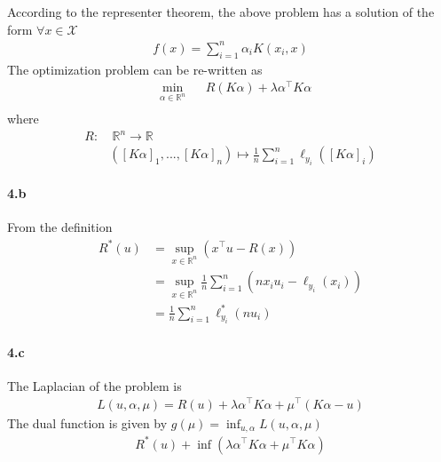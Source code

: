 \documentclass[10pt]{article}
\begin{document}
    According to the representer theorem, the above problem has a solution of
    the form $\forall x\in \mathcal{X}$
    \begin{align*}
        f(x) = \sum_{i=1}^n \alpha_i K(x_i, x)
    \end{align*}
    The optimization problem can be re-written as 
    \begin{equation*}
        \begin{aligned}
        & \underset{\alpha\in\mathbb{R}^n}{\text{min}}
        & & R(K\alpha) + \lambda \alpha^\top K \alpha\\
        \end{aligned}
    \end{equation*} 
    where 
    \begin{align*}
        R:& \ \mathbb{R}^n \rightarrow \mathbb{R}\\
        & ([K\alpha]_1, ..., [K\alpha]_n) \mapsto \frac{1}{n}\sum_{i=1}^n
        \ell_{y_i}([K\alpha]_i)
    \end{align*}

    \paragraph{4.b} From the definition
    \begin{align*}
        R^*(u) &= \sup_{x \in \mathbb{R}^n}\left( x^\top u - R(x) \right) \\
        &= \sup_{x \in \mathbb{R}^n} \frac{1}{n}\sum_{i=1}^n (nx_i u_i - 
        \ell_{y_i}(x_i))\\
        &= \frac{1}{n}\sum_{i=1}^n \ell^*_{y_i}(nu_i)
    \end{align*}
        
    \paragraph{4.c} The Laplacian of the problem is 
    \begin{align*}
        L(u, \alpha, \mu) = R(u) + \lambda \alpha^\top K \alpha + \mu^\top (
        K\alpha - u)
    \end{align*}
    The dual function is given by $g(\mu) = \inf_{u, \alpha} L(u, \alpha, \mu)$
    \begin{align*}
        R^*(u) + \inf(\lambda\alpha^\top K \alpha + \mu^\top K\alpha)
    \end{align*}
\end{document}
